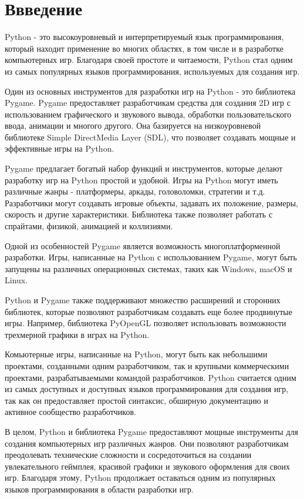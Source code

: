 \chapter{Ввведение}

Python - это высокоуровневый и интерпретируемый язык программирования, который находит применение во многих областях, в том числе и в разработке компьютерных игр. Благодаря своей простоте и читаемости, Python стал одним из самых популярных языков программирования, используемых для создания игр.

Один из основных инструментов для разработки игр на Python - это библиотека Pygame. Pygame предоставляет разработчикам средства для создания 2D игр с использованием графического и звукового вывода, обработки пользовательского ввода, анимации и многого другого. Она базируется на низкоуровневой библиотеке Simple DirectMedia Layer (SDL), что позволяет создавать мощные и эффективные игры на Python.

Pygame предлагает богатый набор функций и инструментов, которые делают разработку игр на Python простой и удобной. Игры на Python могут иметь различные жанры - платформеры, аркады, головоломки, стратегии и т.д. Разработчики могут создавать игровые объекты, задавать их положение, размеры, скорость и другие характеристики. Библиотека также позволяет работать с спрайтами, физикой, анимацией и коллизиями.

Одной из особенностей Pygame является возможность многоплатформенной разработки. Игры, написанные на Python с использованием Pygame, могут быть запущены на различных операционных системах, таких как Windows, macOS и Linux.

Python и Pygame также поддерживают множество расширений и сторонних библиотек, которые позволяют разработчикам создавать еще более продвинутые игры. Например, библиотека PyOpenGL позволяет использовать возможности трехмерной графики в играх на Python.

Комьютерные игры, написанные на Python, могут быть как небольшими проектами, созданными одним разработчиком, так и крупными коммерческими проектами, разрабатываемыми командой разработчиков. Python считается одним из самых доступных и доступных языков программирования для создания игр, так как он предоставляет простой синтаксис, обширную документацию и активное сообщество разработчиков.

В целом, Python и библиотека Pygame предоставляют мощные инструменты для создания компьютерных игр различных жанров. Они позволяют разработчикам преодолевать технические сложности и сосредоточиться на создании увлекательного геймплея, красивой графики и звукового оформления для своих игр. Благодаря этому, Python продолжает оставаться одним из популярных языков программирования в области разработки игр.

